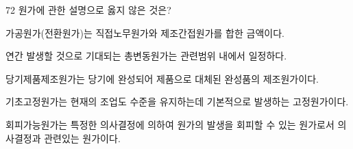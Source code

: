 \begin{question}{72}
원가에 관한 설명으로 옳지 않은 것은?
\begin{choices}
  \item 가공원가(전환원가)는 직접노무원가와 제조간접원가를 합한 금액이다.
  \item 연간 발생할 것으로 기대되는 총변동원가는 관련범위 내에서 일정하다.
  \item 당기제품제조원가는 당기에 완성되어 제품으로 대체된 완성품의 제조원가이다.
  \item 기초고정원가는 현재의 조업도 수준을 유지하는데 기본적으로 발생하는 고정원가이다.
  \item 회피가능원가는 특정한 의사결정에 의하여 원가의 발생을 회피할 수 있는 원가로서 의사결정과 관련있는 원가이다.
\end{choices}
\end{question}
